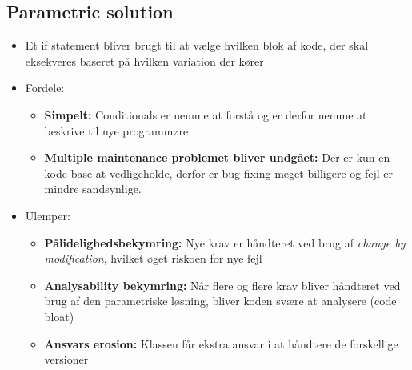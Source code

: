 \documentclass[a4, english]{article}
\begin{document}
\subsection{Parametric solution}
\begin{itemize}
	\item Et if statement bliver brugt til at vælge hvilken blok af kode, der skal eksekveres baseret på hvilken variation der kører 
  \item Fordele:
  \begin{itemize}
  	\item \textbf{Simpelt:} Conditionals er nemme at forstå og er derfor nemme at beskrive til nye programmøre 
    \item \textbf{Multiple maintenance problemet bliver undgået:} Der er kun en kode base at vedligeholde, derfor er bug fixing meget billigere og fejl er mindre sandsynlige. 
  \end{itemize}
  \item Ulemper:
  \begin{itemize}
  	\item \textbf{Pålidelighedsbekymring:} Nye krav er håndteret ved brug af \textit{change by modification}, hvilket øget riskoen for nye fejl
    \item \textbf{Analysability bekymring:} Når flere og flere krav bliver håndteret ved brug af den parametriske løsning, bliver koden svære at analysere (code bloat)
    \item \textbf{Ansvars erosion:} Klassen får ekstra ansvar i at håndtere de forskellige versioner
  \end{itemize}
\end{itemize}
\end{document}
